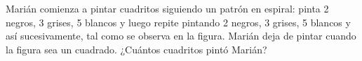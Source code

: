Marián comienza a pintar cuadritos siguiendo un patrón en espiral: pinta 2 negros, 3 grises, 5 blancos y luego repite pintando 2 negros, 3 grises, 5 blancos y así sucesivamente, tal como se observa en la figura. Marián deja de pintar cuando la figura sea un cuadrado. ¿Cuántos cuadritos pintó Marián?